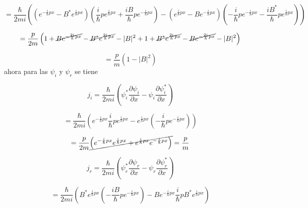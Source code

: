 \documentclass[12pt,a4paper]{article}
\begin{document}
\begin{enumerate}
\begin{enumerate}
        \begin{equation*}
            = \frac{\hbar}{2 m i} \left((e^{-\frac{i}{\hbar} px} - B^* e^{\frac{i}{\hbar}px}) (\frac{i}{\hbar} p e^{\frac{i}{\hbar} px} + \frac{iB}{\hbar}p  e^{-\frac{i}{\hbar}px}) - (e^{\frac{i}{\hbar} px} - B e^{-\frac{i}{\hbar}px}) (-\frac{i}{\hbar}p e^{-\frac{i}{\hbar} px} - \frac{iB^*}{\hbar}p e^{\frac{i}{\hbar}px})\right)
        \end{equation*}
        
        \begin{equation*}
            = \frac{p}{2 m } \left( 1 + \cancel{ B  e^{-\frac{2i}{\hbar}px} }-\cancel{ B^* e^{\frac{2i}{\hbar}px}}- |B|^2 + 1 + \cancel{B^* e^{\frac{2i}{\hbar} px}}- \cancel{B e^{- \frac{2i}{\hbar}px}} - |B|^2\right)
        \end{equation*}
        
        \begin{equation*}
            = \frac{p}{m} (1 - |B|^2)
        \end{equation*}
        ahora para las $\psi_i$ y $\psi_r$ se tiene
        
        \begin{equation*}
            j_i = \frac{\hbar}{2 m i} \left(\psi_i^* \frac{\partial \psi_i}{\partial x} - \psi_i \frac{\partial \psi_i^*}{\partial x}\right)
        \end{equation*}
        
        \begin{equation*}
            =\frac{\hbar}{2 m i} \left(e^{-\frac{i}{\hbar}px}\frac{i}{\hbar}p e^{\frac{i}{\hbar}px} - e^{\frac{i}{\hbar}px} (-\frac{i}{\hbar}p e^{-\frac{i}{\hbar}px})\right)
        \end{equation*}
        
        \begin{equation*}
            =\frac{p}{2 m } \cancel{\left(e^{-\frac{i}{\hbar}px} e^{\frac{i}{\hbar}px} + e^{\frac{i}{\hbar}px}  e^{-\frac{i}{\hbar}px}\right)} = \frac{p}{m}
        \end{equation*}
        
        \begin{equation*}
            j_r = \frac{\hbar}{2 m i} \left(\psi_r^* \frac{\partial \psi_r}{\partial x} - \psi_r \frac{\partial \psi_r^*}{\partial x}\right)
        \end{equation*}
        
        \begin{equation*}
            = \frac{\hbar}{2 m i} \left(B^* e^{\frac{i}{\hbar}px} (-\frac{iB}{\hbar}p e^{-\frac{i}{\hbar}px}) - B e^{-\frac{i}{\hbar}px} \frac{i}{\hbar}p B^* e^{\frac{i}{\hbar}px}\right)
        \end{equation*}
        

\end{enumerate}
\end{enumerate}
\end{document}

